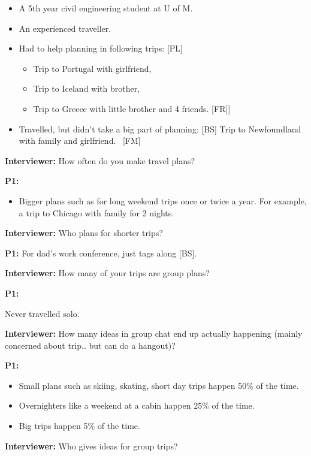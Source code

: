 \documentclass[12pt,a4paper]{article}
\begin{document}
\begin{itemize}
    \item A 5th year civil engineering student at U of M. 
    \item An experienced traveller. 
    \item Had to help planning in following trips: [PL]
    \begin{itemize}
        \item Trip to Portugal with girlfriend, 
        \item Trip to Iceland with brother, 
        \item Trip to Greece with little brother and 4 friends. [FR]]
    \end{itemize}
    \item Travelled, but didn’t take a big part of planning: [BS]
Trip to Newfoundland with family and girlfriend.  [FM]

\end{itemize}

\textbf{Interviewer:} How often do you make travel plans? 

\textbf{P1:}
\begin{itemize}
    \item Bigger plans such as for long weekend trips once or twice a year.
For example, a trip to Chicago with family for 2 nights.

\end{itemize}
\textbf{Interviewer:} Who plans for shorter trips? 

\textbf{P1:} For dad’s work conference, just tags along [BS]. 

\textbf{Interviewer:} How many of your trips are group plans? 

\textbf{P1:}

Never travelled solo.

\textbf{Interviewer:} How many ideas in group chat end up actually happening (mainly concerned about trip.. but can do a hangout)? 

\textbf{P1:}

\begin{itemize}
    \item Small plans such as skiing, skating, short day trips happen 50\% of the time. 
    \item Overnighters like a weekend at a cabin happen 25\% of the time. 
    \item Big trips happen 5\% of the time. 
\end{itemize}

\textbf{Interviewer:} Who gives ideas for group trips? 
\end{document}
